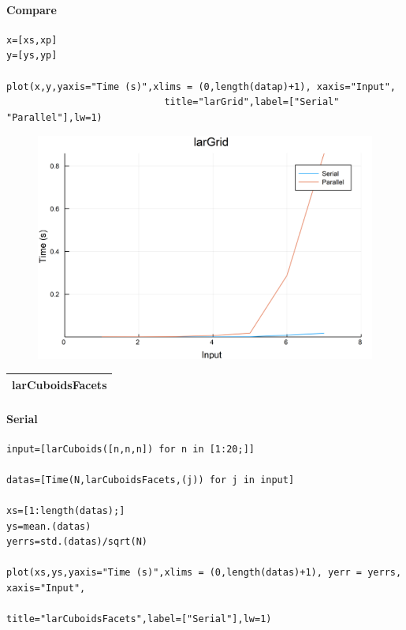 \documentclass{article}
\begin{document}
\paragraph{Compare}
\begin{flushleft}\small
\begin{list}{}{} \item
    \begin{Verbatim}[tabsize=4]
x=[xs,xp]
y=[ys,yp]

plot(x,y,yaxis="Time (s)",xlims = (0,length(datap)+1), xaxis="Input",
                            title="larGrid",label=["Serial" "Parallel"],lw=1)
    \end{Verbatim}
\end{list}
\end{flushleft}   
\vspace{3ex}
\begin{figure}[h!]
\centering
\includegraphics[scale=0.06]{larGridCom.png}
\end{figure}

\vspace{4ex}

\newpage
\begin{tabular}{p{16cm}}
\hline
larCuboidsFacets\\
\hline
\end{tabular}

\paragraph{Serial}
\begin{flushleft}\small
\begin{list}{}{} \item
    \begin{Verbatim}[tabsize=4]
input=[larCuboids([n,n,n]) for n in [1:20;]]

datas=[Time(N,larCuboidsFacets,(j)) for j in input]

xs=[1:length(datas);]
ys=mean.(datas)
yerrs=std.(datas)/sqrt(N)

plot(xs,ys,yaxis="Time (s)",xlims = (0,length(datas)+1), yerr = yerrs, xaxis="Input",
                                            title="larCuboidsFacets",label=["Serial"],lw=1)
    \end{Verbatim}
\end{list}
\end{flushleft}  
\end{document}
